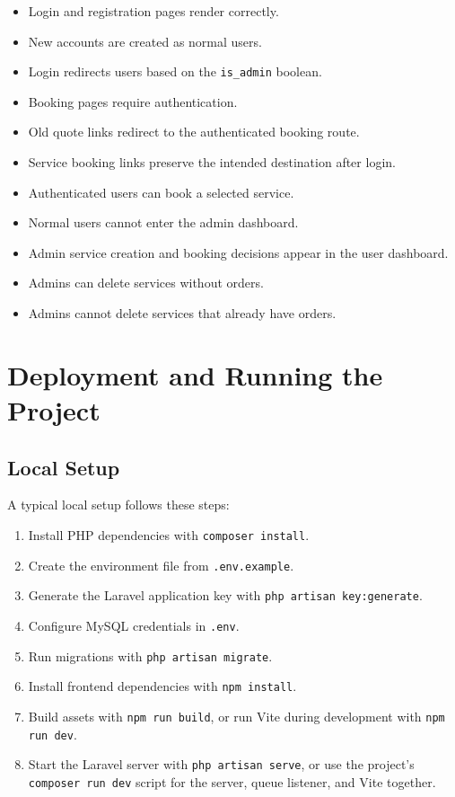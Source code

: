 \documentclass[12pt,a4paper]{report}
\begin{document}
\begin{itemize}
    \item Login and registration pages render correctly.
    \item New accounts are created as normal users.
    \item Login redirects users based on the \texttt{is\_admin} boolean.
    \item Booking pages require authentication.
    \item Old quote links redirect to the authenticated booking route.
    \item Service booking links preserve the intended destination after login.
    \item Authenticated users can book a selected service.
    \item Normal users cannot enter the admin dashboard.
    \item Admin service creation and booking decisions appear in the user dashboard.
    \item Admins can delete services without orders.
    \item Admins cannot delete services that already have orders.
\end{itemize}

\chapter{Deployment and Running the Project}

\section{Local Setup}

A typical local setup follows these steps:

\begin{enumerate}
    \item Install PHP dependencies with \texttt{composer install}.
    \item Create the environment file from \texttt{.env.example}.
    \item Generate the Laravel application key with \texttt{php artisan key:generate}.
    \item Configure MySQL credentials in \texttt{.env}.
    \item Run migrations with \texttt{php artisan migrate}.
    \item Install frontend dependencies with \texttt{npm install}.
    \item Build assets with \texttt{npm run build}, or run Vite during development with \texttt{npm run dev}.
    \item Start the Laravel server with \texttt{php artisan serve}, or use the project's \texttt{composer run dev} script for the server, queue listener, and Vite together.
\end{enumerate}
\end{document}
